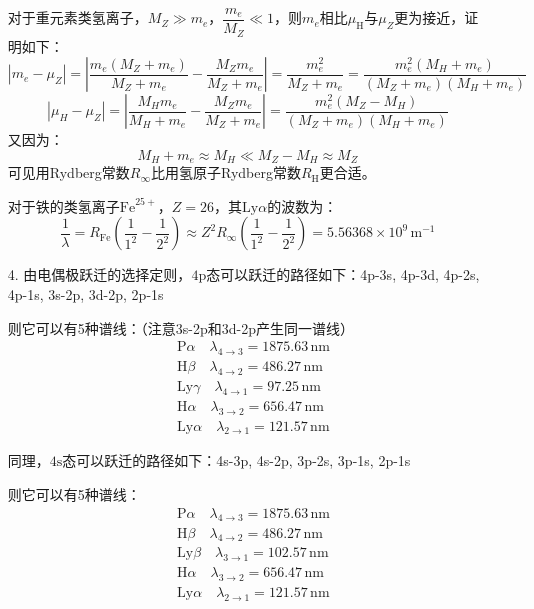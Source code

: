 \documentclass[a4paper]{article}
\begin{document}
\begin{enumerate}
    对于重元素类氢离子，$M_Z \gg m_e$，$\dfrac{m_e}{M_Z} \ll 1$，则$m_e$相比$\mu_\mathrm{H}$与$\mu_Z$更为接近，证明如下：
    \[
        |m_e - \mu_Z| = \left|\frac{m_e(M_Z + m_e)}{M_Z + m_e} - \frac{M_Z m_e}{M_Z + m_e}\right| = \frac{m_e^2}{M_Z + m_e} = \frac{m_e^2(M_H + m_e)}{(M_Z + m_e)(M_H + m_e)}
    \]
    \[
        |\mu_H - \mu_Z| = \left|\frac{M_H m_e}{M_H + m_e} - \frac{M_Z m_e}{M_Z + m_e}\right| = \frac{m_e^2(M_Z - M_H)}{(M_Z + m_e)(M_H + m_e)}
    \]
    又因为：
    \[
    M_H + m_e \approx M_H \ll M_Z - M_H \approx M_Z
    \]
    可见用Rydberg常数$R_\infty$比用氢原子Rydberg常数$R_\mathrm{H}$更合适。

    对于铁的类氢离子$\mathrm{Fe}^{25+}$，$Z = 26$，其$\mathrm{Ly}\alpha$的波数为：
    \[
        \frac{1}{\lambda} = R_\mathrm{Fe}\left(\frac{1}{1^2}-\frac{1}{2^2}\right) \approx Z^2 R_\infty\left(\frac{1}{1^2}-\frac{1}{2^2}\right) = 5.56368 \times 10^9\,\mathrm{m^{-1}}
    \]

    \bigskip
    \item[4.]
    由电偶极跃迁的选择定则，$4\mathrm{p}$态可以跃迁的路径如下：4p-3s, 4p-3d, 4p-2s, 4p-1s, 3s-2p, 3d-2p, 2p-1s

    则它可以有5种谱线：（注意3s-2p和3d-2p产生同一谱线）
    \begin{align*}
        &\mathrm{P}\alpha\quad \lambda_{4 \to 3} = 1875.63\,\mathrm{nm} \\
        &\mathrm{H}\beta\quad \lambda_{4 \to 2} = 486.27\,\mathrm{nm} \\
        &\mathrm{Ly}\gamma\quad \lambda_{4 \to 1} = 97.25\,\mathrm{nm} \\
        &\mathrm{H}\alpha\quad \lambda_{3 \to 2} = 656.47\,\mathrm{nm} \\
        &\mathrm{Ly}\alpha\quad \lambda_{2 \to 1} = 121.57\,\mathrm{nm}
    \end{align*}

    同理，$4\mathrm{s}$态可以跃迁的路径如下：4s-3p, 4s-2p, 3p-2s, 3p-1s, 2p-1s

    则它可以有5种谱线：
    \begin{align*}
        &\mathrm{P}\alpha\quad \lambda_{4 \to 3} = 1875.63\,\mathrm{nm} \\
        &\mathrm{H}\beta\quad \lambda_{4 \to 2} = 486.27\,\mathrm{nm} \\
        &\mathrm{Ly}\beta\quad \lambda_{3 \to 1} = 102.57\,\mathrm{nm} \\
        &\mathrm{H}\alpha\quad \lambda_{3 \to 2} = 656.47\,\mathrm{nm} \\
        &\mathrm{Ly}\alpha\quad \lambda_{2 \to 1} = 121.57\,\mathrm{nm}
    \end{align*}


\end{enumerate}
\end{document}
